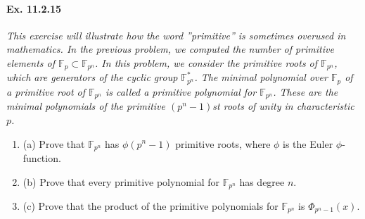 \documentclass[11pt,a4paper]{article}
\newcommand{\be} {\begin{enumerate}}
\newcommand{\ee} {\end{enumerate}}
\newcommand{\F}{\mathbb{F}}
\begin{document}
\paragraph{Ex. 11.2.15}

{\it This exercise will illustrate how the word ''primitive'' is sometimes overused in mathematics. In the previous problem, we computed the number of primitive elements of $\F_p \subset \F_{p^n}$. In this problem, we consider the primitive roots of $\F_{p^n}$, which are generators of the cyclic group $\F_{p^n}^*$. The minimal polynomial over $\F_p$ of a primitive root of $\F_{p^n}$ is called a primitive polynomial for $\F_{p^n}$. These are the minimal polynomials of the primitive $(p^n-1)$st roots of unity in characteristic $p$.
\be
\item[(a)] Prove that $\F_{p^n}$ has $\phi(p^n-1)$ primitive roots, where $\phi$ is the Euler $\phi$-function.
\item[(b)] Prove that every primitive polynomial for $\F_{p^n}$ has degree $n$.
\item[(c)] Prove that the product of the primitive polynomials for $\F_{p^n}$ is $\Phi_{p^n-1}(x)$.
\ee
}
\end{document}
